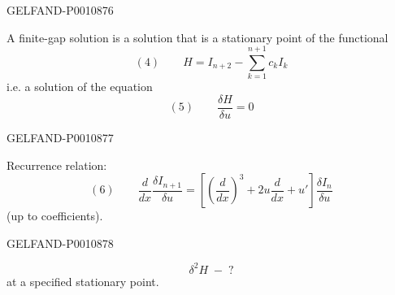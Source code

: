 \begin{GelfandAdjacentEvidence}{GELFAND-P001087}{6}


A finite-gap solution is a solution that is a stationary point of the functional
\[
(4)\qquad H=I_{n+2}-\sum_{k=1}^{n+1}c_k I_k
\]
i.e. a solution of the equation
\[
(5)\qquad \frac{\delta H}{\delta u}=0
\]
\end{GelfandAdjacentEvidence}
\begin{GelfandAdjacentEvidence}{GELFAND-P001087}{7}


Recurrence relation:
\[
(6)\qquad
\frac{d}{dx}\frac{\delta I_{n+1}}{\delta u}
=\left[\left(\frac{d}{dx}\right)^3+2u\frac{d}{dx}+u'\right]
\frac{\delta I_n}{\delta u}
\]
(up to coefficients).
\end{GelfandAdjacentEvidence}
\begin{GelfandAdjacentEvidence}{GELFAND-P001087}{8}


\[
\delta^2 H\; -\; ?
\]
at a specified stationary point.
\end{GelfandAdjacentEvidence}



